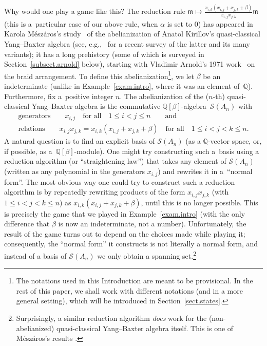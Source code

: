 \documentclass[pdftex]{sigma}
\numberwithin{equation}{section}
\begin{document}
Why would one play a game like this? The reduction rule $\mathfrak{m}\mapsto\frac{x_{i,k} ( x_{i,j}+x_{j,k}+\beta ) }{x_{i,j}x_{j,k}}\mathfrak{m}$ (this is a~particular case of our above rule, when $\alpha$ is set to $0$) has appeared in Karola M\'{e}sz\'{a}ros's study~\cite{Meszar09} of the abelianization of Anatol Kirillov's quasi-classical Yang--Baxter algebra (see, e.g.,~\cite{Kirill16} for a recent survey of the latter and its many variants); it has a long prehistory (some of which is surveyed in Section~\ref{subsect.arnold} below), starting with Vladimir Arnold's 1971 work~\cite{Arnold71} on the braid arrangement. To define this abelianization\footnote{The notations used in this Introduction are meant to be provisional. In the rest of this paper, we shall work with different notations (and in a more general setting), which will be introduced in Section~\ref{sect.states}.}, we let $\beta$ be an indeterminate (unlike in Example~\ref{exam.intro}, where it was an element of~$\mathbb{Q}$). Furthermore, fix a~positive integer $n$. The abelianization of the ($n$-th) quasi-classical Yang--Baxter algebra is the commutative $\mathbb{Q}[\beta] $-algebra~$\mathcal{S}(A_{n}) $ with
\begin{gather*}
\text{generators}\qquad x_{i,j}\quad \text{for all} \quad 1\leq i<j\leq n\qquad\text{and}\\
\text{relations}\qquad x_{i,j}x_{j,k}=x_{i,k} (x_{i,j}+x_{j,k}+\beta) \quad \text{for all} \quad 1\leq i<j<k\leq n.
\end{gather*}
A natural question is to find an explicit basis of $\mathcal{S} (A_{n}) $ (as a $\mathbb{Q}$-vector space, or, if possible, as a~$\mathbb{Q}[\beta] $-module). One might try constructing such a~basis using a reduction algorithm (or ``straightening law'') that takes any element of $\mathcal{S} ( A_{n}) $ (written as any polynomial in the generators $x_{i,j}$) and rewrites it in a~``normal form''. The most obvious way one could try to construct such a reduction algorithm is by repeatedly rewriting products of the form $x_{i,j}x_{j,k}$ (with $1\leq i<j<k\leq n$) as $x_{i,k} ( x_{i,j}+x_{j,k}+\beta ) $, until this is no longer possible. This is precisely the game that we played in Example~\ref{exam.intro} (with the only difference that $\beta$ is now an indeterminate, not a number). Unfortunately, the result of the game turns out to depend on the choices made while playing it; consequently, the ``normal form'' it constructs is not literally a normal form, and instead of a basis of $\mathcal{S} ( A_{n}) $ we only obtain a spanning set.\footnote{Surprisingly, a similar reduction algorithm \textit{does} work for the (non-abelianized) quasi-classical Yang--Baxter algebra itself. This is one of M\'{e}sz\'{a}ros's results \cite[Theorem 30]{Meszar09}.}
\end{document}
